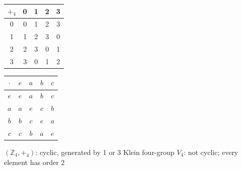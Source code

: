 \begin{center}
\renewcommand{\arraystretch}{1.25}
\begin{tabular}{c|cccc}
$+_4$ & 0 & 1 & 2 & 3 \\ \hline
0 & 0 & 1 & 2 & 3 \\
1 & 1 & 2 & 3 & 0 \\
2 & 2 & 3 & 0 & 1 \\
3 & 3 & 0 & 1 & 2 \\
\end{tabular}
\qquad\qquad
\begin{tabular}{c|cccc}
$\cdot$ & $e$ & $a$ & $b$ & $c$ \\ \hline
$e$ & $e$ & $a$ & $b$ & $c$ \\
$a$ & $a$ & $e$ & $c$ & $b$ \\
$b$ & $b$ & $c$ & $e$ & $a$ \\
$c$ & $c$ & $b$ & $a$ & $e$ \\
\end{tabular}

\smallskip
{\small $(\mathbb{Z}_4, +_4)$: cyclic, generated by 1 or 3 \qquad Klein four-group $V_4$: not cyclic; every element has order 2}
\end{center}
